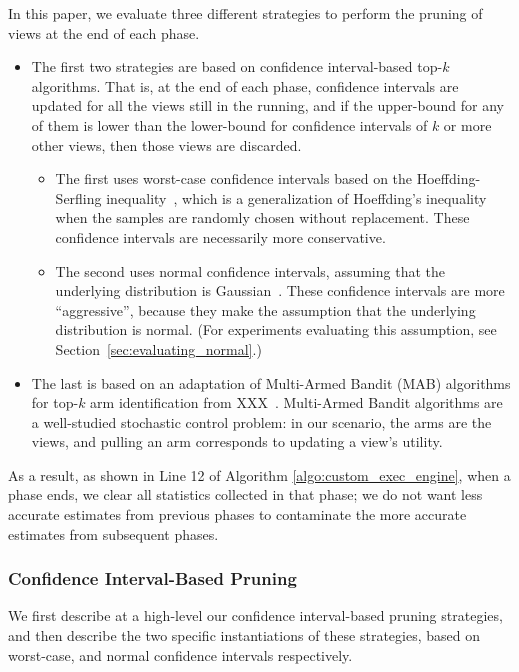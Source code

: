 In this paper, we evaluate three different strategies
to perform the pruning of views at the end of each phase.
\begin{itemize}
\item The first two strategies are based on confidence interval-based top-$k$ algorithms.
That is, at the end of each phase, confidence intervals are updated for all
the views still in the running, and if the upper-bound for any of them
is lower than the lower-bound for confidence intervals of $k$ or more other views,
then those views are discarded.
\begin{itemize}
\item The first uses worst-case confidence intervals based on the
Hoeffding-Serfling inequality~\cite{serfling1974probability}, 
which is a generalization of Hoeffding's inequality~\cite{hoeffding1963probability}
when the samples are randomly chosen without replacement.
These confidence intervals are necessarily more conservative.
\item The second uses normal confidence intervals, assuming that 
the underlying distribution is Gaussian~\cite{all-of-statistics}.
These confidence intervals are more ``aggressive'', because they make the assumption
that the underlying distribution is normal.
(For experiments evaluating this assumption, see Section~\ref{sec:evaluating_normal}.)
\end{itemize}
\item The last is based on an adaptation of Multi-Armed Bandit (MAB) algorithms
for top-$k$ arm identification from XXX~\cite{}. 
Multi-Armed Bandit algorithms are a well-studied stochastic control problem:
in our scenario, the arms are the views, and pulling an arm corresponds
to updating a view's utility.
\end{itemize}
As a result, as shown in Line 12 of Algorithm \ref{algo:custom_exec_engine},
when a phase ends, we clear all statistics collected in that phase; we do not
want less accurate estimates from previous phases to contaminate the more
accurate estimates from subsequent phases.


\subsubsection{Confidence Interval-Based Pruning}
We first describe at a high-level our confidence interval-based pruning strategies,
and then describe the two specific instantiations of these strategies,
based on worst-case, and normal confidence intervals respectively.

